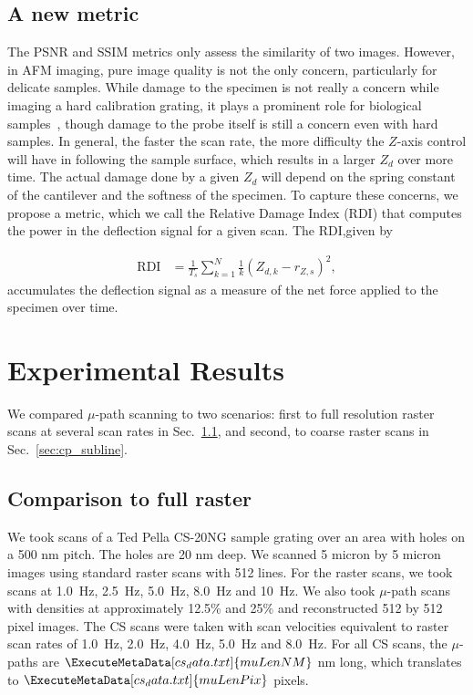 \documentclass[journal]{IEEEtran}
\newcommand{\scanD}[1]{\ExecuteMetaData[cs_data.txt]{#1}}
\begin{document}
\subsection{A new metric}
The PSNR and SSIM metrics only assess the similarity of two images.
However, in AFM imaging, pure image quality is not the only concern,
particularly for delicate samples. While damage to the specimen is not really a concern while imaging a
hard calibration grating, it plays a prominent role for biological
samples~\cite{ando_highspeed_2008}, though damage to the probe itself
is still a concern even with hard samples. In general, the faster the scan rate, the more
difficulty the $Z$-axis control will have in following the sample
surface, which results in a larger $Z_d$ over more time. The actual
damage done by a given $Z_d$ will depend on the spring constant of the
cantilever and the softness of the specimen. To capture these concerns, we propose a
metric, which we call the Relative Damage Index (RDI) that computes
the power in the deflection signal for a given scan. The RDI,given by

\begin{align}
  \text{RDI} &= \frac{1}{T_s}\sum_{k=1}^N \frac{1}{k} \left(Z_{d,k} - r_{Z,s}\right)^2, \label{eqn:RDI}
\end{align}
accumulates the deflection signal as a measure of the net force applied to the specimen  over time.

\section{Experimental Results}\label{sec:results}
We compared $\mu$-path scanning to two scenarios: first to full resolution raster scans at several scan rates in
Sec.~\ref{sec:cp_full}, and second, to coarse raster scans in
Sec.~\ref{sec:cp_subline}.

\subsection{Comparison to full raster}\label{sec:cp_full}
We took scans of a Ted Pella CS-20NG sample grating over an area with
holes on a 500 nm pitch. The holes are 20 nm deep. We scanned 5 micron
by 5 micron images using standard raster scans with 512 lines. For the
raster scans, we took scans at 1.0~Hz, 2.5~Hz, 5.0~Hz, 8.0~Hz and
10~Hz. We also took $\mu$-path scans with densities at approximately 12.5\% and
25\% and reconstructed 512 by 512 pixel images. The CS scans were
taken with scan velocities equivalent to raster scan rates of 1.0~Hz,
2.0~Hz, 4.0~Hz, 5.0~Hz and 8.0~Hz. For all CS scans, the $\mu$-paths are
$\scanD{muLenNM}$ nm long, which translates to $\scanD{muLenPix}$
pixels.
\end{document}
